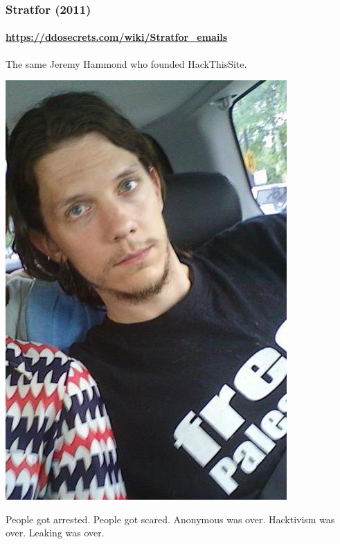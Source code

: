 \documentclass[aspectratio=169,usenames,dvipsnames]{beamer}
\begin{document}
\begin{frame}
  \frametitle{Stratfor (2011)}
  \framesubtitle{\url{https://ddosecrets.com/wiki/Stratfor_emails}}

  The same Jeremy Hammond who founded HackThisSite.

  \vspace{5mm}

  \centering

  \includegraphics[width=\textwidth,height=0.6\textheight,keepaspectratio]{img/jeremy_hammond.jpg}

\end{frame}

\begin{frame}[c]

  \centering

  People got arrested.
  \pause\hspace{1mm}People got scared.
  \pause\hspace{1mm}Anonymous was over.
  \pause\hspace{1mm}Hacktivism was over.
  \pause\hspace{1mm}Leaking was over.

\end{frame}
\end{document}

